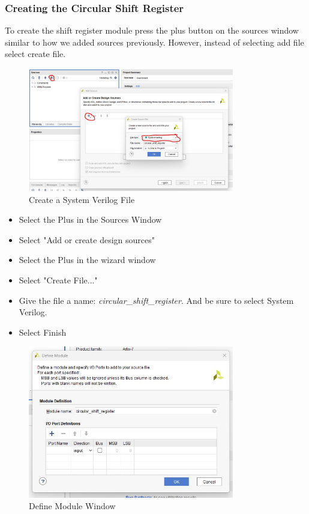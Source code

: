 \subsubsection{Creating the Circular Shift Register}
To create the shift register module press the plus button on the sources window similar to how we added sources previously. However, instead of selecting add file select create file.
\begin{figure}[H]
    \centering
    \includegraphics[width=9cm]{Images/CreateFile/create_system_verilog_file.jpg}
    \caption{Create a System Verilog File}
    \label{fig:enter-label}
\end{figure}
\begin{itemize}
    \item Select the Plus in the Sources Window
    \item Select "Add or create design sources"
    \item Select the Plus in the wizard window
    \item Select "Create File..."
    \item Give the file a name: \textit{circular\_shift\_register}. And be sure to select System Verilog.
    \item Select Finish
\end{itemize}
\begin{figure}[H]
    \centering
    \includegraphics[width=9cm]{Images/CreateFile/DefineModule.jpg}
    \caption{Define Module Window}
    \label{fig:enter-label}
\end{figure}
